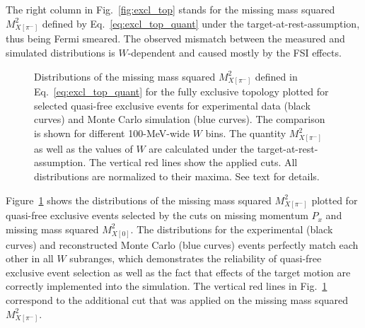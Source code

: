 The right column in Fig.~\ref{fig:excl_top} stands for the missing mass squared $M_{X[\pi^{-}]}^{2}$ defined by Eq.~\eqref{eq:excl_top_quant} under the target-at-rest-assumption, thus being Fermi smeared. The observed mismatch between the measured and simulated distributions is $W$-dependent and caused mostly by the FSI effects. 
\begin{figure}[!ht]
\begin{center}
\end{center}
\caption{\small Distributions of the missing mass squared $M^{2}_{X[\pi^{-}]}$ defined in Eq.~\eqref{eq:excl_top_quant} for the fully exclusive topology plotted for selected quasi-free exclusive events for experimental data (black curves) and Monte Carlo simulation (blue curves). The comparison is shown for different 100-MeV-wide $W$ bins. The quantity $M^{2}_{X[\pi^{-}]}$ as well as the values of $W$ are calculated under the target-at-rest-assumption. The vertical red lines show the applied cuts. All distributions are normalized to their maxima. See text for details. }
\label{fig:excl_top_aft}
\end{figure}

Figure~\ref{fig:excl_top_aft} shows the distributions of the missing mass squared $M_{X[\pi^{-}]}^{2}$ plotted for quasi-free exclusive events selected by the cuts on missing momentum $P_{x}$ and missing mass squared $M^{2}_{X[0]}$. The distributions for the experimental (black curves) and reconstructed Monte Carlo (blue curves) events perfectly match each other in all $W$ subranges, which demonstrates the reliability of quasi-free exclusive event selection as well as the fact that effects of the target motion are correctly implemented into the simulation. The vertical red lines in Fig.~\ref{fig:excl_top_aft} correspond to the additional cut that was applied on the missing mass squared $M_{X[\pi^{-}]}^{2}$.

